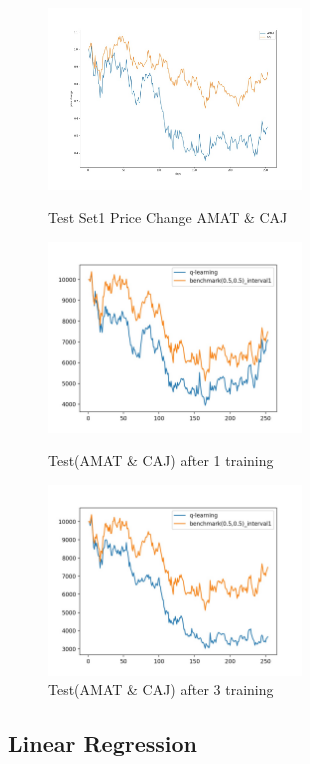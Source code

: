 \begin{figure}[H]
\begin{center}
\includegraphics[clip, width=0.6\textwidth]{Graphics/test1_pricechange.jpg} \caption{Test Set1 Price Change AMAT \& CAJ}
\includegraphics[clip, width=0.6\textwidth]{Graphics/test_KS1_AC_action.jpg} \caption{Test(AMAT \& CAJ) after 1 training}
\includegraphics[clip, width=0.6\textwidth]{Graphics/test_LP3_AC_action.jpg} \caption{Test(AMAT \& CAJ) after 3 training
}
\end{center}
\end{figure}

\subsection{Linear Regression}


